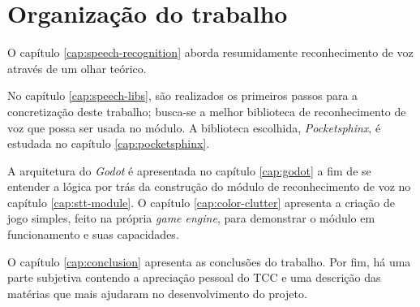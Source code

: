
\section{Organização do trabalho}

O capítulo \ref{cap:speech-recognition} aborda resumidamente reconhecimento de voz através de um olhar teórico.\iffalse A seguir, no capítulo \ref{cap:hmm}, apresenta-se uma forma de realizar reconhecimento de voz por meio do \textit{Modelo Oculto de Markov}.\fi

No capítulo \ref{cap:speech-libs}, são realizados os primeiros passos para a concretização deste trabalho; busca-se a melhor biblioteca de reconhecimento de voz que possa ser usada no módulo. A biblioteca escolhida, \textit{Pocketsphinx}, é estudada no capítulo \ref{cap:pocketsphinx}.

A arquitetura do \textit{Godot} é apresentada no capítulo \ref{cap:godot} a fim de se entender a lógica por trás da construção do módulo de reconhecimento de voz no capítulo \ref{cap:stt-module}. O capítulo \ref{cap:color-clutter} apresenta a criação de jogo simples, feito na própria \textit{game engine}, para demonstrar o módulo em funcionamento e suas capacidades.

O capítulo \ref{cap:conclusion} apresenta as conclusões do trabalho. Por fim, há uma parte subjetiva contendo a apreciação pessoal do TCC e uma descrição das matérias que mais ajudaram no desenvolvimento do projeto.
